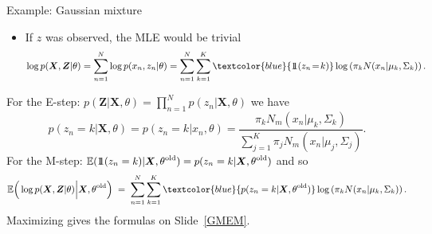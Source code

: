 \documentclass[11pt,handout,aspectratio=169]{beamer}
\begin{document}
\begin{frame}{Example: Gaussian mixture}
\begin{itemize}
	\item If $z$ was observed, the MLE would be trivial
	$${\small \log p(\boldsymbol X,\boldsymbol Z|\theta)=\sum_{n=1}^N \log p(x_n,z_n|\theta)=\sum_{n=1}^N\sum_{k=1}^K \textcolor{blue}{1\!\!1(z_n\!=\!k)}\log\left(\pi_kN(x_n|\mu_k,\Sigma_k)\right).}$$
\end{itemize}
For the E-step: $p(\boldsymbol{Z}|\boldsymbol{X},\theta)=\prod_{n=1}^N p(z_n|\boldsymbol{X},\theta)$ we have
$$
p(z_n=k|\boldsymbol{X},\theta)=p(z_n=k|x_n,\theta)=\frac{\pi_k N_m(x_n|\mu_k,\Sigma_k)}{\sum_{j=1}^K \pi_j N_m(x_n|\mu_j,\Sigma_j)}.
$$
For the M-step: ${\small \mathbb E(1\!\!1(z_n=k)|\boldsymbol{X},\theta^{\rm old})=p(z_n=k|\boldsymbol{X},\theta^{\rm old})}$ and so 
$$
{\small \mathbb E\Big(\log p(\boldsymbol X,\boldsymbol Z|\theta)\Big|\boldsymbol{X},\theta^{\rm old}\Big)\;=\;\sum_{n=1}^N\sum_{k=1}^K \textcolor{blue}{p(z_n=k|\boldsymbol{X},\theta^{\rm old})}\log\left(\pi_kN(x_n|\mu_k,\Sigma_k)\right).}
$$
Maximizing gives the formulas on Slide~\ref{GMEM}.
\end{frame}
\end{document}
